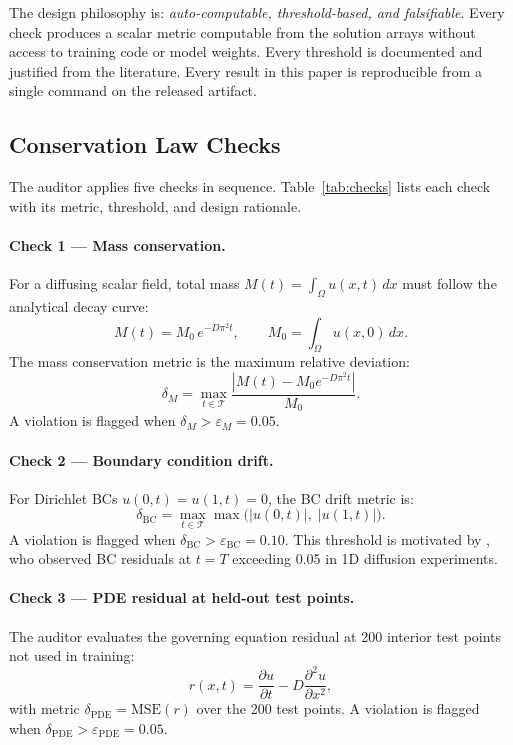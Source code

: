 \documentclass{article}
\begin{document}
The design philosophy is: \emph{auto-computable, threshold-based, and
falsifiable}.
Every check produces a scalar metric computable from the solution arrays
without access to training code or model weights.
Every threshold is documented and justified from the literature.
Every result in this paper is reproducible from a single command on the
released artifact.

\subsection{Conservation Law Checks}

The auditor applies five checks in sequence.
Table~\ref{tab:checks} lists each check with its metric, threshold, and
design rationale.

\paragraph{Check 1 --- Mass conservation.}
For a diffusing scalar field, total mass $M(t) = \int_\Omega u(x,t)\,dx$
must follow the analytical decay curve:
\begin{equation}
  M(t) = M_0\,e^{-D\pi^2 t}, \qquad M_0 = \int_\Omega u(x,0)\,dx.
  \label{eq:mass}
\end{equation}
The mass conservation metric is the maximum relative deviation:
\begin{equation}
  \delta_M = \max_{t\in\mathcal{T}}
    \frac{|M(t) - M_0 e^{-D\pi^2 t}|}{M_0}.
  \label{eq:mass_metric}
\end{equation}
A violation is flagged when $\delta_M > \varepsilon_M = 0.05$.

\paragraph{Check 2 --- Boundary condition drift.}
For Dirichlet BCs $u(0,t) = u(1,t) = 0$, the BC drift metric is:
\begin{equation}
  \delta_\text{BC} = \max_{t\in\mathcal{T}}
    \max\bigl(|u(0,t)|,\;|u(1,t)|\bigr).
\end{equation}
A violation is flagged when $\delta_\text{BC} > \varepsilon_\text{BC} = 0.10$.
This threshold is motivated by \citet{Wang2022WhenPINNsFail}, who observed BC
residuals at $t=T$ exceeding 0.05 in 1D diffusion experiments.

\paragraph{Check 3 --- PDE residual at held-out test points.}
The auditor evaluates the governing equation residual at 200 interior test
points not used in training:
\begin{equation}
  r(x,t) = \frac{\partial u}{\partial t} - D\frac{\partial^2 u}{\partial x^2},
\end{equation}
with metric $\delta_\text{PDE} = \mathrm{MSE}(r)$ over the 200 test points.
A violation is flagged when $\delta_\text{PDE} > \varepsilon_\text{PDE} = 0.05$.
\end{document}
